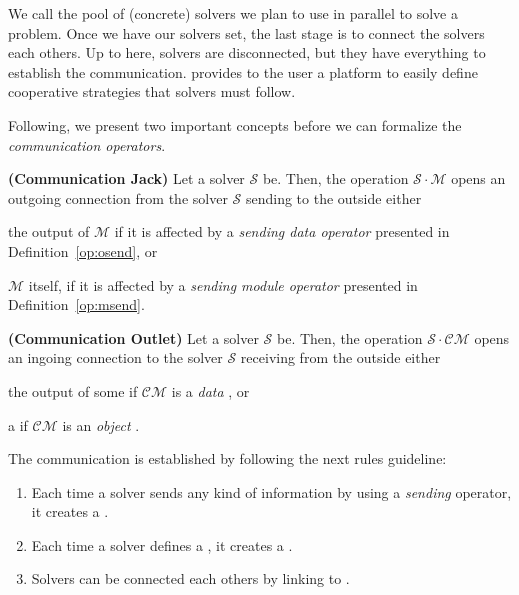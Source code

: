 We call \soset{} the pool of (concrete) solvers we plan to use in parallel to solve a problem. Once we have our solvers set, the last stage is to connect the solvers each others. Up to here, solvers are disconnected, but they have everything to establish the communication. \posl{} provides to the user a platform to easily define cooperative strategies that solvers must follow.

Following, we present two important concepts before we can formalize the {\it communication operators}.

\begin{definition}\label{def:comm_jack}
{\bf (Communication Jack)} Let a solver $\mathcal{S}$ be. Then, the operation $\mathcal{S}\cdot\mathcal{M}$ opens an outgoing connection from the solver $\mathcal{S}$ sending to the outside either 
\begin{inparaenum}[a)]
	\item the output of $\mathcal{M}$ if it is affected by a {\it sending data operator} presented in Definition~\ref{op:osend}, or
	\item $\mathcal{M}$ itself, if it is affected by a {\it sending module operator} presented in Definition~\ref{op:msend}.
\end{inparaenum}
\end{definition} 

\begin{definition}\label{def:comm_outlet}
{\bf (Communication Outlet)} Let a solver $\mathcal{S}$ be. Then, the operation $\mathcal{S}\cdot\mathcal{CM}$ opens an ingoing connection to the solver $\mathcal{S}$ receiving from the outside either 
\begin{inparaenum}[a)]
	\item the output of some \om{} if $\mathcal{CM}$ is a {\it data} \opch{}, or
	\item a \om{} if $\mathcal{CM}$ is an {\it object} \opch.
\end{inparaenum}
\end{definition} 


The communication is established by following the next rules guideline:
\begin{enumerate}%
	\item Each time a solver sends any kind of information by using a {\it sending} operator, it creates a \jack.
	\item Each time a solver defines a \opch, it creates a \outlet. 
	\item Solvers can be connected each others by linking \jacks{} to \outlets.
\end{enumerate} %

